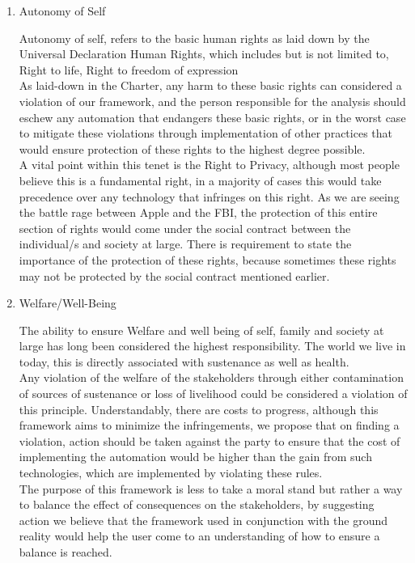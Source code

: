 \begin{enumerate}
  \item Autonomy of Self
    \begin{pointenv}
      Autonomy of self, refers to the basic human rights as laid down by the Universal Declaration Human Rights\cite{assembly1948universal}, which includes but is not limited to, Right to life, Right to freedom of expression\\
      As laid-down in the Charter, any harm to these basic rights can considered a violation of our framework, and the person responsible for the analysis should eschew any automation that endangers these basic rights, or in the worst case to mitigate these violations through implementation of other practices that would ensure protection of these rights to the highest degree possible.\\
      A vital point within this tenet is the Right to Privacy, although most people believe this is a fundamental right, in a majority of  cases this would take precedence over any technology that infringes on this right. As we are seeing the battle rage between Apple and the FBI, the protection of this entire section of rights would come under the social contract between the individual/s and society at large. There is requirement to state the importance of the protection of these rights, because sometimes these rights may not be protected by the social contract mentioned earlier. 
    \end{pointenv}

  \item Welfare/Well-Being
    \begin{pointenv}
      The ability to ensure Welfare and well being of self, family and society at large has long been considered the highest responsibility. The world we live in today, this is directly associated with sustenance as well as health.\\
      Any violation of the welfare of the stakeholders through either contamination of sources of sustenance or loss of livelihood could be considered a violation of this principle. Understandably, there are costs to progress, although this framework aims to minimize the infringements, we propose that on finding a violation, action should be taken against the party to ensure that the cost of implementing the automation would be higher than the gain from such technologies, which are implemented by violating these rules.\\
      The purpose of this framework is less to take a moral stand but rather a way to balance the effect of consequences on the stakeholders, by suggesting action we believe that the framework used in conjunction with the ground reality would help the user come to an understanding of how to ensure a balance is reached. 
    \end{pointenv}


\end{enumerate}
